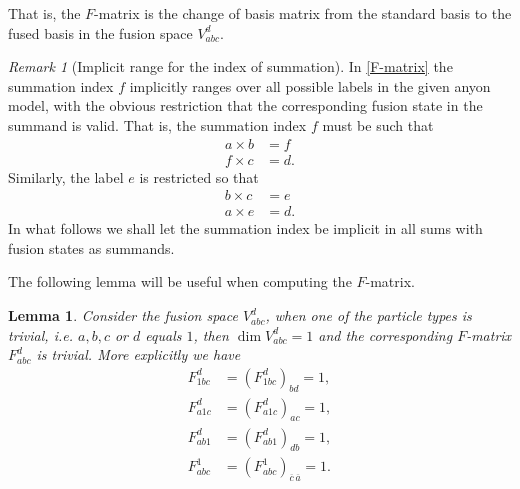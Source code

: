 \documentclass[a4paper,10pt,oneside]{book}
\theoremstyle{plain}
\newtheorem{lemma}[theorem]{Lemma}
\theoremstyle{definition}
\theoremstyle{remark}
\newtheorem{remark}{Remark}[section]
\begin{document}
That is, the $F$-matrix is the change of basis matrix from the standard basis to the fused basis in the fusion space $V_{abc}^d$.

\begin{remark}[Implicit range for the index of summation]\label{rem:sum index range}
  In \cref{F-matrix} the summation index $f$ implicitly ranges over all possible labels in the given anyon model, with the obvious restriction that the corresponding fusion state in the summand is valid. That is, the summation index $f$ must be such that
  \begin{equation}
    \begin{aligned}
      a \times b &= f \\
      f \times c &= d.
    \end{aligned}
  \end{equation}
  Similarly, the label $e$ is restricted so that
  \begin{equation}
    \begin{aligned}
      b \times c &= e \\
      a \times e &= d.
    \end{aligned}
  \end{equation}
  In what follows we shall let the summation index be implicit in all sums with fusion states as summands.
\end{remark}

The following lemma will be useful when computing the $F$-matrix.

\begin{lemma}\label{res:F1}
  Consider the fusion space $V_{abc}^d$, when one of the particle types is trivial, i.e. $a,b,c$ or $d$ equals $1$, then $\dim V_{abc}^d = 1$ and the corresponding $F$-matrix $F_{abc}^d$ is trivial. More explicitly we have
  \begin{equation}
    \begin{aligned}
      F_{1bc}^d &= \left( F_{1bc}^d \right)_{bd} = 1, \\
      F_{a1c}^d &= \left( F_{a1c}^d \right)_{ac} = 1, \\
      F_{ab1}^d &= \left( F_{ab1}^d \right)_{db} = 1, \\
      F_{abc}^1 &= \left( F_{abc}^1 \right)_{\overline{c}\,\overline{a}} = 1.
    \end{aligned}
  \end{equation}
\end{lemma}
\end{document}

